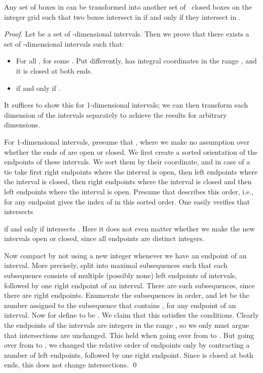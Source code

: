 \documentclass[runningheads]{llncs}
\begin{document}
\newcommand{\lemTransformToInteger}{
Any set  of  boxes in  can be transformed into another set  of~ closed boxes on 
the integer grid  
such that two boxes intersect in  if and only if they intersect in .
}
\begin{lemma}
\label{lem:transformToInteger}
\label{lem:gtransformToInteger}
\lemTransformToInteger
\end{lemma}

\begin{proof}
Let  be a set of -dimensional intervals.
Then we prove that there exists a set  of
-dimensional intervals such that:
\begin{itemize}
\item For all ,  for some
  .  Put differently,
   has integral coordinates in the range ,
  and it is closed at both ends.
\item  if and only if .
\end{itemize}


It suffices to show this for 1-dimensional intervals; we can then
transform each dimension of the intervals separately to achieve the
results for arbitrary dimensions.
  
For 1-dimensional intervals, presume that , where we
make no assumption over whether the ends of  are open or closed.
We first create a sorted orientation of the  endpoints of these
intervals.  We sort them by their coordinate, and in case of a tie
take 
first right endpoints where the interval is open, 
then left endpoints where the interval is closed,
then right endpoints where the interval is closed 
and then left endpoints where the interval is open.  
Presume that  describes this order, i.e., for any endpoint 
 gives the index of  in this sorted order.
One easily verifies that  intersects 

if and only if  intersects .  Here it does not even matter
whether we make the new intervals open or closed, since all endpoints
are distinct integers.

Now compact  by not using a new integer whenever we have
an endpoint of an interval.  More precisely, split  into
maximal subsequences such that each subsequence consists of multiple
(possibly none) left endpoints of intervals, followed by one right
endpoint of an interval.
There are 
 such subsequences, since there are  right endpoints.
Enumerate the subsequences in order, and let  be
the number assigned to the subsequence that contains ,
for any endpoint  of an interval.
Now for  
define  to be .  We
claim
that this satisfies the conditions.  Clearly the endpoints of the
intervals
are integers in the range , so we only must 
argue that intersections are unchanged.
This held when going over from  to
.
But going over from  to , we changed the relative
order 
of endpoints only by contracting a number
of left endpoints, followed by one right endpoint.  Since 
 is closed at both ends, this does not change intersections.
\qed
\end{proof}
\end{document}
